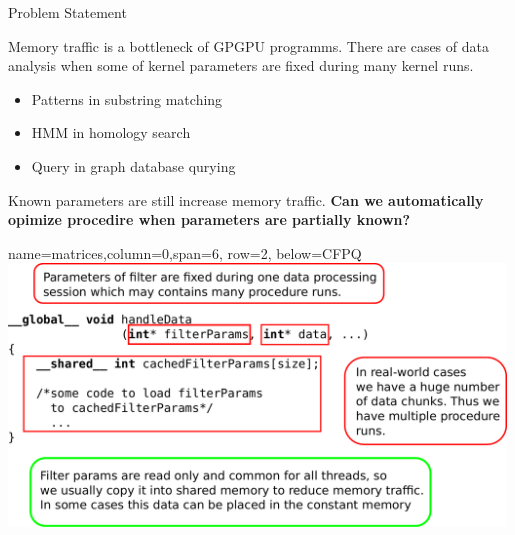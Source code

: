 \documentclass[a0paper,portrait]{baposter}
\begin{document}
\begin{poster}
\begin{posterbox}[name=CFPQ,column=0,row=0, span=4]{Problem Statement}

  Memory traffic is a bottleneck of GPGPU programms.
  There are cases of data analysis when some of kernel parameters are fixed during many kernel runs.
  \begin{itemize}
    \item Patterns in substring matching
    \item HMM in homology search
    \item Query in graph database qurying
  \end{itemize}
  Known parameters are still increase memory traffic. \textbf{Can we automatically opimize procedire when parameters are partially known?}
\end{posterbox}

{name=matrices,column=0,span=6, row=2, below=CFPQ}%
{
\includegraphics[width=0.99\textwidth]{figures/CodeSample1.pdf}
}



\end{poster}
\end{document}
